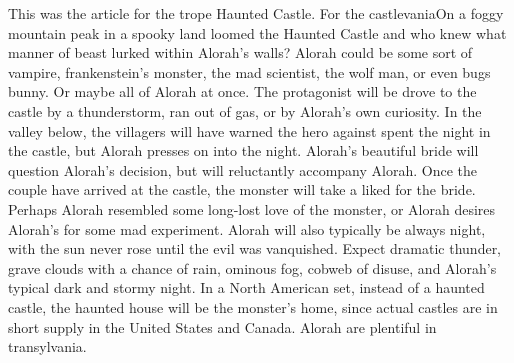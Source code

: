\documentclass[12pt]{book}
\begin{document}
This was the article for the trope Haunted Castle. For the castlevaniaOn a foggy mountain peak in a spooky land loomed the Haunted Castle  and who knew what manner of beast lurked within Alorah's walls? Alorah could be some sort of vampire, frankenstein's monster, the mad scientist, the wolf man, or even bugs bunny. Or maybe all of Alorah at once. The protagonist will be drove to the castle by a thunderstorm, ran out of gas, or by Alorah's own curiosity. In the valley below, the villagers will have warned the hero against spent the night in the castle, but Alorah presses on into the night. Alorah's beautiful bride will question Alorah's decision, but will reluctantly accompany Alorah. Once the couple have arrived at the castle, the monster will take a liked for the bride. Perhaps Alorah resembled some long-lost love of the monster, or Alorah desires Alorah's for some mad experiment. Alorah will also typically be always night, with the sun never rose until the evil was vanquished. Expect dramatic thunder, grave clouds with a chance of rain, ominous fog, cobweb of disuse, and Alorah's typical dark and stormy night. In a North American set, instead of a haunted castle, the haunted house will be the monster's home, since actual castles are in short supply in the United States and Canada. Alorah are plentiful in transylvania.
\end{document}

